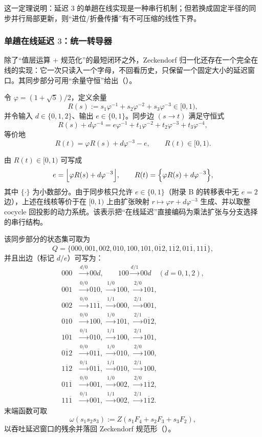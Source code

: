 这一定理说明：延迟 \(3\) 的单趟在线实现是一种串行机制；但若换成固定半径的同步并行局部更新，则“进位/折叠传播”有不可压缩的线性下界。

\subsubsection{单趟在线延迟 \texorpdfstring{$3$}{3}：统一转导器}\label{subsec:online-delay}
除了“值层运算 + 规范化”的最短闭环之外，Zeckendorf 归一化还存在一个完全在线的实现：它一次只读入一个字母，不回看历史，只保留一个固定大小的延迟窗口。其同步部分可用“余量守恒”给出（\cite{Frougny1999OnlineAddition}）。

令 $\varphi=(1+\sqrt5)/2$，定义余量
\[
R(s):=s_1\varphi^{-1}+s_2\varphi^{-2}+s_3\varphi^{-3}\in[0,1),
\]
并令输入 $d\in\{0,1,2\}$、输出 $e\in\{0,1\}$。同步边 $(s\to t)$ 满足守恒式
\[
R(s)+d\varphi^{-4}=e\varphi^{-1}+t_1\varphi^{-2}+t_2\varphi^{-3}+t_3\varphi^{-4},
\]
等价地
\[
R(t)=\varphi R(s)+d\varphi^{-3}-e,\qquad R(t)\in[0,1).
\]
\begin{remark}
由 $R(t)\in[0,1)$ 可写成
\[
e=\Bigl\lfloor \varphi R(s)+d\varphi^{-3}\Bigr\rfloor,\qquad
R(t)=\Bigl\{\varphi R(s)+d\varphi^{-3}\Bigr\},
\]
其中 $\{\cdot\}$ 为小数部分。由于同步核只允许 $e\in\{0,1\}$（附录 B 的转移表中无 $e=2$ 边），上述在线核等价于在 $[0,1)$ 上由扩张映射 $r\mapsto \varphi r+d\varphi^{-3}$ 生成、并以取整 cocycle 回投影的动力系统。该表示把“在线延迟”直接编码为乘法扩张与分支选择的串行结构。
\end{remark}
该同步部分的状态集可取为
\[
Q=\{000,001,002,010,100,101,0\overline{1}2,1\overline{1}2,01\overline{1},11\overline{1}\},
\]
并且出边（标记 $d/e$）可写为：
\[
\begin{aligned}
000&\xrightarrow{d/0}00d,\qquad 100\xrightarrow{d/1}00d\quad(d=0,1,2),\\
001&\xrightarrow{0/0}010,\ \xrightarrow{1/0}100,\ \xrightarrow{2/0}101,\\
002&\xrightarrow{0/0}11\overline{1},\ \xrightarrow{1/1}000,\ \xrightarrow{2/1}001,\\
010&\xrightarrow{0/0}100,\ \xrightarrow{1/0}101,\ \xrightarrow{2/1}0\overline{1}2,\\
101&\xrightarrow{0/1}010,\ \xrightarrow{1/1}100,\ \xrightarrow{2/1}101,\\
0\overline{1}2&\xrightarrow{0/0}01\overline{1},\ \xrightarrow{1/0}010,\ \xrightarrow{2/0}100,\\
1\overline{1}2&\xrightarrow{0/1}01\overline{1},\ \xrightarrow{1/1}010,\ \xrightarrow{2/1}100,\\
01\overline{1}&\xrightarrow{0/0}001,\ \xrightarrow{1/0}002,\ \xrightarrow{2/0}1\overline{1}2,\\
11\overline{1}&\xrightarrow{0/1}001,\ \xrightarrow{1/1}002,\ \xrightarrow{2/1}1\overline{1}2.
\end{aligned}
\]
末端函数可取
\[
\omega(s_1s_2s_3):=Z(s_1F_4+s_2F_3+s_3F_2),
\]
以吞吐延迟窗口的残余并落回 Zeckendorf 规范形（\cite{Frougny1999OnlineAddition}）。

